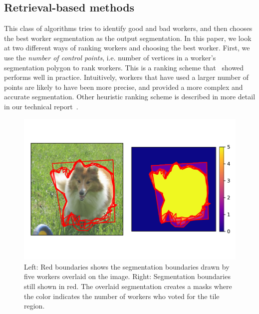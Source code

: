 \subsection{Retrieval-based methods}
This class of algorithms tries to identify good and bad workers, and then chooses the best worker segmentation as the output segmentation. In this paper, we look at two different ways of ranking workers and choosing the best worker. First, we use the {\em number of control points}, i.e. number of vertices in a worker's segmentation polygon to rank workers. This is a ranking scheme that~\cite{Vittayakorn2011} showed performs well in practice. Intuitively, workers that have used a larger number of points are likely to have been more precise, and provided a more complex and accurate segmentation. Other heuristic ranking scheme is described in more detail in our technical report~\cite{segmentation-tr}.
\begin{figure}
\centering
\includegraphics[width=\textwidth]{plots/tile_demo.pdf}
\caption{Left: Red boundaries shows the segmentation boundaries drawn by five workers overlaid on the image. Right: Segmentation boundaries still shown in red. The overlaid segmentation creates a masks where the color indicates the number of workers who voted for the tile region.}
\label{tile_demo}
\end{figure}

